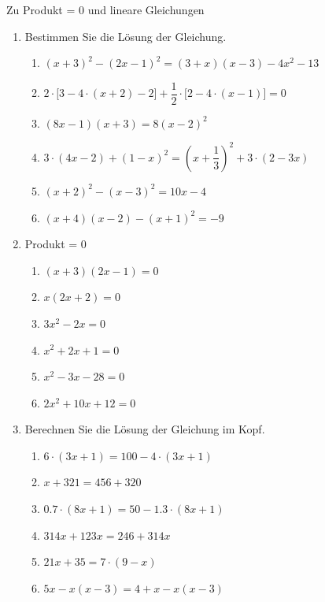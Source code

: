 \clearpage
\begin{ueb}
    {Zu Produkt = 0 und lineare Gleichungen}{}
    \begin{enumerate}

        \item Bestimmen Sie die Lösung der Gleichung.

              \begin{enumerate}
                  \item \((x+3)^2-(2x-1)^2=(3+x)(x-3)-4x^2-13\)

                  \item \(2\cdot\bigl[3-4\cdot(x+2)-2\bigr]
                        +\dfrac{1}{2}\cdot\bigl[2-4\cdot(x-1)\bigr]=0\)

                  \item \((8x-1)(x+3)=8(x-2)^2\)

                  \item \(3\cdot(4x-2)+(1-x)^2
                        =\left(x+\dfrac{1}{3}\right)^2+3\cdot(2-3x)\)
                  \item \((x+2)^2-(x-3)^2=10x-4\)
                  \item \((x+4)(x-2)-(x+1)^2=-9\)
              \end{enumerate}
        \item Produkt = 0
              \begin{enumerate}
                  \item \((x+3)(2x-1)=0\)
                  \item \(x(2x+2)=0\)
                  \item \(3x^2-2x=0\)
                  \item \(x^2+2x+1=0\)
                  \item \(x^2-3x-28=0\)
                  \item \(2x^2+10x+12=0\)
              \end{enumerate}
        \item Berechnen Sie die Lösung der Gleichung im Kopf.

              \begin{enumerate}
                  \item \(6\cdot(3x+1)=100-4\cdot(3x+1)\)
                  \item \(x+321=456+320\)
                  \item \(0.7\cdot(8x+1)=50-1.3\cdot(8x+1)\)
                  \item \(314x+123x=246+314x\)
                  \item \(21x+35=7\cdot(9-x)\)
                  \item \(5x-x(x-3)=4+x-x(x-3)\)
              \end{enumerate}
    \end{enumerate}
\end{ueb}

